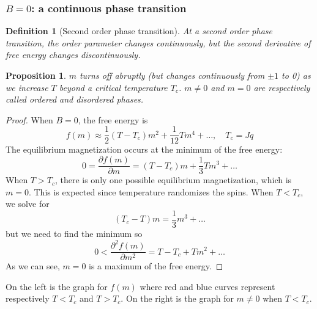\documentclass[a4paper]{article}
\theoremstyle{new}
\newtheorem{defi}{Definition}[section]
\newtheorem{prop}{Proposition}[section]
\begin{document}
\subsubsection{$B=0$: a continuous phase transition}
\begin{defi}[Second order phase transition]
At a second order phase transition, the order parameter changes continuously, but the second derivative of free energy changes discontinuously.
\end{defi}
\begin{prop}
$m$ turns off abruptly (but changes continuously from $\pm1$ to 0) as we increase $T$ beyond a critical temperature $T_c$. $m\neq 0$ and $m=0$ are respectively called ordered and disordered phases.
\end{prop}
\begin{proof}
When $B=0$, the free energy is 
$$f(m)\approx\frac{1}{2}(T-T_c)m^2+\frac{1}{12}Tm^4+\dots,\quad T_c=Jq$$
The equilibrium magnetization occurs at the minimum of the free energy:
$$0=\frac{\partial f(m)}{\partial m}=(T-T_c)m+\frac{1}{3}Tm^3+\dots$$
When $T>T_c$, there is only one possible equilibrium magnetization, which is $m=0$. This is expected since temperature randomizes the spins. When $T<T_c$, we solve for
$$(T_c-T)m=\frac{1}{3}m^3+\dots$$
but we need to find the minimum so
$$0<\frac{\partial^2f(m)}{\partial m^2}=T-T_c+Tm^2+\dots$$
As we can see, $m=0$ is a maximum of the free energy.
\end{proof}
On the left is the graph for $f(m)$ where red and blue curves represent respectively $T<T_c$ and $T>T_c$. On the right is the graph for $m\neq 0$ when $T<T_c$. 
\begin{center}
\end{center}
\end{document}

